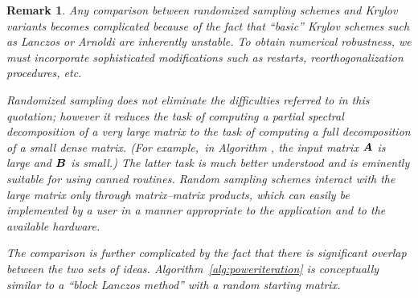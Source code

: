 \documentclass{article}
\newtheorem{remark}{Remark}
\begin{document}
\lsp

\begin{remark} \rm
Any comparison between randomized sampling schemes and Krylov variants
becomes complicated because of the fact that ``basic'' Krylov schemes such
as Lanczos \cite[p.~473]{golub} or Arnoldi \cite[p.~499]{golub}
are inherently unstable. To obtain numerical robustness, we must incorporate
sophisticated modifications such as restarts, reorthogonalization procedures, etc.




\noindent
Randomized sampling does not eliminate the difficulties referred to in this quotation;
however it reduces the task of computing a \emph{partial} spectral decomposition
of a very large matrix to the task of computing a \emph{full} decomposition of
a small dense matrix.  (For example,~in Algorithm \cite[Algorithm~5.1]{RM}, the input matrix
$\bm{A}$ is large and $\bm{B}$ is small.) The latter task is much better understood
and is eminently suitable for using canned routines.  Random sampling schemes
interact with the large matrix only through matrix--matrix products, which can
easily be implemented by a user in a manner appropriate to the application
and to the available hardware.


The comparison is further complicated by the fact that there is significant
overlap between the two sets of ideas. Algorithm~\ref{alg:poweriteration} is
conceptually similar to a ``block Lanczos method'' \cite[p.~485]{golub} with a random starting matrix.

\end{remark}
\end{document}
